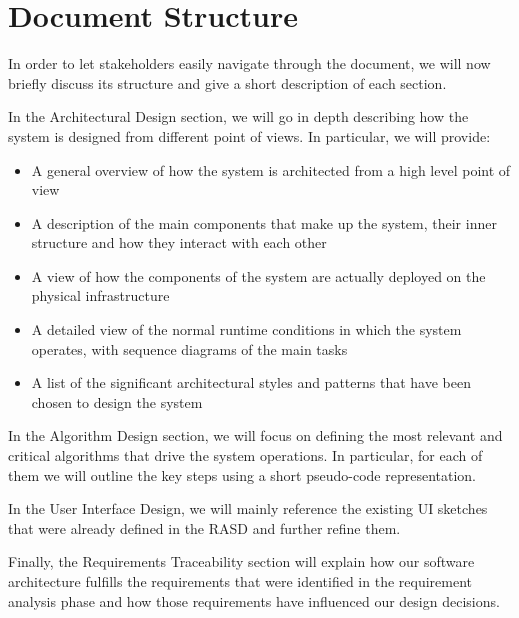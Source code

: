 \section{Document Structure}
In order to let stakeholders easily navigate through the document, we will now briefly discuss its structure and give a short description of each section.

In the Architectural Design section, we will go in depth describing how the system is designed from different point of views. In particular, we will provide: 
	\begin{itemize}
	\item A general overview of how the system is architected from a high level point of view
	\item A description of the main components that make up the system, their inner structure and how they interact with each other
	\item A view of how the components of the system are actually deployed on the physical infrastructure 
	\item A detailed view of the normal runtime conditions in which the system operates, with sequence diagrams of the main tasks
	\item A list of the significant architectural styles and patterns that have been chosen to design the system
	\end{itemize}
	
In the Algorithm Design section, we will focus on defining the most relevant and critical algorithms that drive the system operations. In particular, for each of them we will outline the key steps using a short pseudo-code representation.

In the User Interface Design, we will mainly reference the existing UI sketches that were already defined in the RASD and further refine them. 

Finally, the Requirements Traceability section will explain how our software architecture fulfills the requirements that were identified in the requirement analysis phase and how those requirements have influenced our design decisions. 
